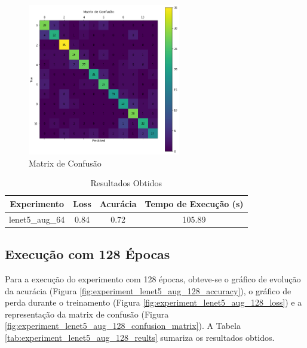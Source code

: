 \documentclass[12pt]{article}
\begin{document}
\begin{figure}[!htb]
  \centering
  \includegraphics[width=18em]{experiments/lenet5_aug_64/confusion_matrix.png}
  \caption{Matrix de Confusão}
  \label{fig:experiment_lenet5_aug_64_confusion_matrix}
\end{figure}

\begin{table}[!htb]
  \centering
  \begin{tabular}{|c|c|c|c|}
    \hline
    \textbf{Experimento} & \textbf{Loss} & \textbf{Acurácia} & \textbf{Tempo de Execução (s)} \\ \hline
    lenet5\_aug\_64      & 0.84          & 0.72              & 105.89                         \\ \hline
  \end{tabular}
  \caption{Resultados Obtidos}
  \label{tab:experiment_lenet5_aug_64_reults}
\end{table}

\newpage

\subsection{Execução com 128 Épocas}

Para a execução do experimento com 128 épocas, obteve-se o gráfico de evolução da acurácia (Figura \ref{fig:experiment_lenet5_aug_128_accuracy}), o gráfico de perda durante o treinamento (Figura \ref{fig:experiment_lenet5_aug_128_loss}) e a representação da matrix de confusão (Figura \ref{fig:experiment_lenet5_aug_128_confusion_matrix}). A Tabela \ref{tab:experiment_lenet5_aug_128_reults} sumariza os resultados obtidos.
\end{document}
